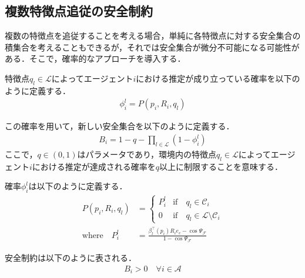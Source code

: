 \subsection{複数特徴点追従の安全制約}

複数の特徴点を追従することを考える場合，単純に各特徴点に対する安全集合の積集合を考えることもできるが，それでは安全集合が微分不可能になる可能性がある．そこで，確率的なアプローチを導入する．

特徴点$q_l \in \mathcal{L}$によってエージェント$i$における推定が成り立っている確率を以下のように定義する．
\begin{equation}
\begin{aligned}
\phi_{i}^l = P(p_i,R_i,q_l)
\label{eq:probability_single}
\end{aligned}
\end{equation}

この確率を用いて，新しい安全集合を以下のように定義する．
\begin{equation}
\begin{aligned}
B_{i} = 1-q-\prod_{l\in\mathcal{L}}(1-\phi_{i}^l)
\label{eq:safe_set_multi}
\end{aligned}
\end{equation}
ここで，$q \in (0,1)$はパラメータであり，環境内の特徴点$q_l \in \mathcal{L}$によってエージェント$i$における推定が達成される確率を$q$以上に制限することを意味する．

確率$\phi_{i}^l$は以下のように定義する．
\begin{equation}
\begin{aligned}
P(p_i,R_i,q_l) &= \left\{ \begin{array}{ll}
P_i^l & \mathrm{if} \quad q_l\in\mathcal{C}_i \\
0 & \mathrm{if} \quad q_l\in \mathcal{L}\setminus\mathcal{C}_i
\end{array} \right. \\
\mathrm{where} \quad P_i^l &= \frac{\beta_l^\top(p_i) R_i e_c -\cos\Psi_\mathcal{F}}{1-\cos\Psi_\mathcal{F}}
\label{eq:probability_definition}
\end{aligned}
\end{equation}

安全制約は以下のように表される．
\begin{equation}
\begin{aligned}
B_{i} > 0 \quad \forall i \in \mathcal{A}
\label{eq:safe_constraint_multi}
\end{aligned}
\end{equation}

